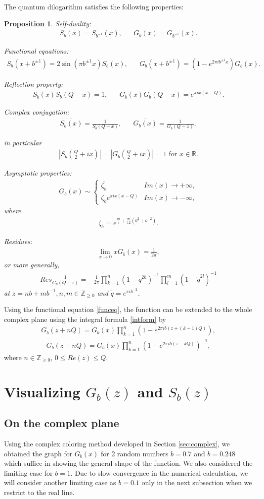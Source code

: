 \documentclass[10pt,reqno]{article}
\newtheorem{Prop}[Thm]{Proposition}
\def\R{\mathbb{R}}
\def\Z{\mathbb{Z}}
\def\to{\longrightarrow}
\def\ze{\zeta}
\def\oo{\infty}
\def\inv{^{-1}}
\def\over[#1]{\overline{#1}}
\def\tab{\;\;\;\;\;\;}
\newcommand{\Eq}[1]{\begin{align}#1\end{align}}
\numberwithin{equation}{section}
\begin{document}
The quantum dilogarithm satisfies the following properties:
\begin{Prop} Self-duality:
\Eq{S_b(x)=S_{b\inv}(x),\tab G_b(x)=G_{b\inv}(x).}

Functional equations: \Eq{\label{funceq}S_b(x+b^{\pm1})=2\sin(\pi
b^{\pm1}x)S_b(x),\tab G_b(x+b^{\pm 1})=(1-e^{2\pi ib^{\pm 1}x})G_b(x).}

Reflection property:
\Eq{\label{reflection}S_b(x)S_b(Q-x)=1,\tab G_b(x)G_b(Q-x)=e^{\pi
ix(x-Q)}.}

Complex conjugation: \Eq{\overline{S_b(x)}=\frac{1}{S_b(Q-\over[x])},\tab \overline{G_b(x)}=\frac{1}{G_b(Q-\bar{x})},}

in particular 
\Eq{\left|S_b(\frac{Q}{2}+ix)\right|=\left|G_b(\frac{Q}{2}+ix)\right|=1 \mbox{ for $x\in\R$}.}

\label{asymp} Asymptotic properties:
\Eq{G_b(x)\sim\left\{\begin{array}{cc}\bar{\ze_b}&Im(x)\to+\oo,\\\ze_b
e^{\pi ix(x-Q)}&Im(x)\to-\oo,\end{array}\right.}
where
\Eq{\ze_b=e^{\frac{\pi i}{4}+\frac{\pi i}{12}(b^2+b^{-2})}.}

\label{residue} Residues:
\Eq{\lim_{x\to 0} xG_b(x)=\frac{1}{2\pi},} or more generally,
\Eq{Res\frac{1}{G_b(Q+z)}=-\frac{1}{2\pi}\prod_{k=1}^n(1-q^{2k})\inv\prod_{l=1}^m(1-\widetilde{q}^{2l})\inv}
at $z=nb+mb\inv, n,m\in\Z_{\geq0}$ and $\widetilde{q}=e^{\pi i
b^{-2}}$.
\end{Prop}

Using the functional equation \eqref{funceq}, the function can be extended to the whole complex plane using the integral formula \eqref{intform} by
\Eq{G_b(z+nQ)=G_b(x)\prod_{k=1}^n (1-e^{2\pi ib(z+(k-1)Q)}),}
\Eq{G_b(z-nQ)=G_b(x)\prod_{k=1}^n (1-e^{2\pi ib(z-kQ)})\inv,}
where $n\in \Z_{\geq 0}$, $0\leq Re(z)\leq Q$.

\section{Visualizing $G_b(z)$ and $S_b(z)$}\label{sec:graphs}
\subsection{On the complex plane}
Using the complex coloring method developed in Section \ref{sec:complex}, we obtained the graph for $G_b(x)$ for 2 random numbers $b=0.7$ and $b=0.248$ which suffice in showing the general shape of the function. We also considered the limiting case for $b=1$. Due to slow convergence in the numerical calculation, we will consider another limiting case as $b=0.1$ only in the next subsection when we restrict to the real line.
\end{document}

